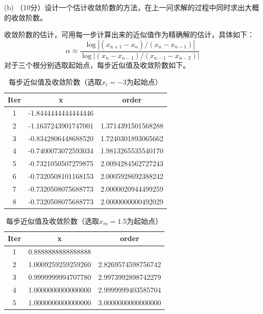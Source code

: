 \documentclass[12pt,a4paper,UTF8]{ctexart}
\begin{document}
\begin{enumerate}
          (b) （10分）设计一个估计收敛阶数的方法，在上一问求解的过程中同时求出大概的收敛阶数。

          收敛阶数的估计，可用每一步计算出来的近似值作为精确解的估计，具体如下：
          \begin{equation}
              \alpha \approx \frac{\log \left|\left(x_{n+1}-x_{n}\right) /\left(x_{n}-x_{n-1}\right)\right|}{\log \left|\left(x_{n}-x_{n-1}\right) /\left(x_{n-1}-x_{n-2}\right)\right|}
          \end{equation}
          对于三个根分别选取起始点，每步近似值及收敛阶数如下。
          \begin{table}[H]
              \centering
              \begin{tabular}{|c|c|c|}
                  \hline
                  \textbf{Iter} & \textbf{x}          & \textbf{order}     \\ \hline
                  1             & -1.8444444444444446 &                    \\ \hline
                  2             & -1.1637243901747001 & 1.3714391501568288 \\ \hline
                  3             & -0.8342806448688520 & 1.7240301893065662 \\ \hline
                  4             & -0.7400073072593034 & 1.9813265535540170 \\ \hline
                  5             & -0.7321050507279875 & 2.0094284562727243 \\ \hline
                  6             & -0.7320508101168153 & 2.0005928692388242 \\ \hline
                  7             & -0.7320508075688773 & 2.0000020944499259 \\ \hline
                  8             & -0.7320508075688773 & 2.0000000000492029 \\ \hline
              \end{tabular}
              \caption{每步近似值及收敛阶数（选取$x_{l}=-3$为起始点）}
          \end{table}

          \begin{table}[H]
              \centering
              \begin{tabular}{|c|c|c|}
                  \hline
                  \textbf{Iter} & \textbf{x}         & \textbf{order}     \\ \hline
                  1             & 0.8888888888888888 &                    \\ \hline
                  2             & 1.0009259259259260 & 2.8269574598756742 \\ \hline
                  3             & 0.9999999994707780 & 2.9973992898742279 \\ \hline
                  4             & 1.0000000000000000 & 2.9999999403585704 \\ \hline
                  5             & 1.0000000000000000 & 3.0000000000000000 \\ \hline
              \end{tabular}
              \caption{每步近似值及收敛阶数（选取$x_{m}=1.5$为起始点）}
          \end{table}


\end{enumerate}
\end{document}
